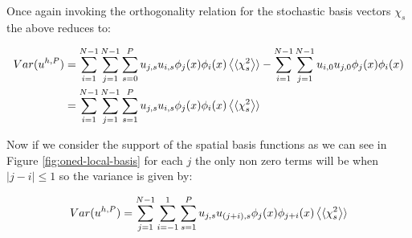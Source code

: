 Once again invoking the orthogonality relation for the stochastic basis vectors
$\chi_s$ the above reduces to:

\begin{align}
  \begin{split}
    Var(u^{h,P}) &= \sum_{i=1}^{N - 1}\sum_{j=1}^{N - 1}\sum_{s=0}^P
      u_{j,s}u_{i,s}\phi_j(x)\phi_i(x)\left\langle\langle\chi_s^2\right\rangle\rangle
            - \sum_{i=1}^{N - 1}\sum_{j=1}^{N-1}u_{i,0}u_{j,0}\phi_j(x)\phi_i(x) \\
      &= \sum_{i=1}^{N-1}\sum_{j=1}^{N-1}\sum_{s=1}^P
            u_{j,s}u_{i,s}\phi_j(x)\phi_i(x)\left\langle\langle\chi_s^2\right\rangle\rangle
  \end{split}
\end{align}

Now if we consider the support of the spatial basis functions as we can see in
Figure \ref{fig:oned-local-basis} for each $j$ the only non zero terms will be
when $|j - i| \leq 1$ so the variance is given by:

\begin{equation}
    Var(u^{h,P})= \sum_{j=1}^{N-1}\sum_{i=-1}^1\sum_{s=1}^P
      u_{j,s}u_{(j+i),s}\phi_j(x)\phi_{j+i}(x)\left\langle\langle\chi_s^2\right\rangle\rangle
\end{equation}
